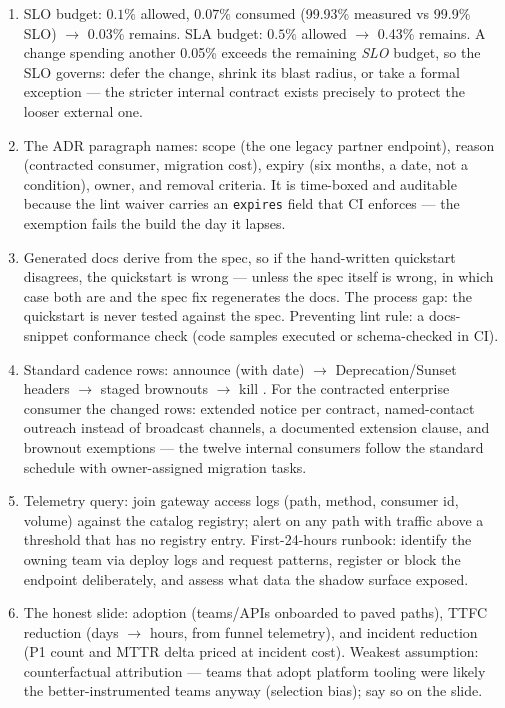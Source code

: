 \begin{enumerate}[leftmargin=2.2em]
    first-call outcomes with error reason codes. The instrument, not the
    fix, is the deliverable.
  \item SLO budget: $0.1\%$ allowed, $0.07\%$ consumed (99.93\% measured
    vs 99.9\% SLO) $\to$ 0.03\% remains. SLA budget: $0.5\%$ allowed
    $\to$ 0.43\% remains. A change spending another 0.05\% exceeds the
    remaining \emph{SLO} budget, so the SLO governs: defer the change,
    shrink its blast radius, or take a formal exception --- the stricter
    internal contract exists precisely to protect the looser external one.
  \item The ADR paragraph names: scope (the one legacy partner endpoint),
    reason (contracted consumer, migration cost), expiry (six months, a
    date, not a condition), owner, and removal criteria. It is time-boxed
    and auditable because the lint waiver carries an \texttt{expires} field
    that CI enforces --- the exemption fails the build the day it lapses.
  \item Generated docs derive from the spec, so if the hand-written
    quickstart disagrees, the quickstart is wrong --- unless the spec
    itself is wrong, in which case both are and the spec fix regenerates
    the docs. The process gap: the quickstart is never tested against the
    spec. Preventing lint rule: a docs-snippet conformance check (code
    samples executed or schema-checked in CI).
  \item Standard cadence rows: announce (with date) $\to$
    Deprecation/Sunset headers $\to$ staged brownouts $\to$ kill
    \cite{rfc8594}. For the contracted enterprise consumer the changed
    rows: extended notice per contract, named-contact outreach instead of
    broadcast channels, a documented extension clause, and brownout
    exemptions --- the twelve internal consumers follow the standard
    schedule with owner-assigned migration tasks.
  \item Telemetry query: join gateway access logs (path, method, consumer
    id, volume) against the catalog registry; alert on any path with
    traffic above a threshold that has no registry entry. First-24-hours
    runbook: identify the owning team via deploy logs and request patterns,
    register or block the endpoint deliberately, and assess what data the
    shadow surface exposed.
  \item The honest slide: adoption (teams/APIs onboarded to paved paths),
    TTFC reduction (days $\to$ hours, from funnel telemetry), and incident
    reduction (P1 count and MTTR delta priced at incident cost). Weakest
    assumption: counterfactual attribution --- teams that adopt platform
    tooling were likely the better-instrumented teams anyway (selection
    bias); say so on the slide.
\end{enumerate}


